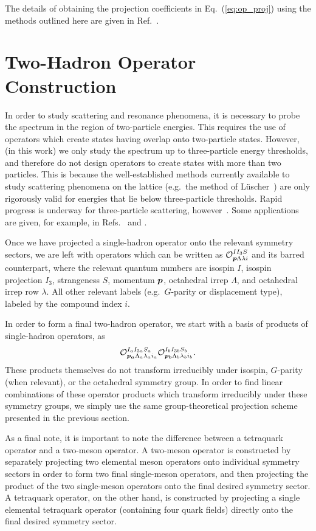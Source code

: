     The details of obtaining the projection coefficients in Eq.~(\ref{eq:op_proj}) using the methods outlined here are given in Ref.~\cite{Basak:2005aq}.
    \section{Two-Hadron Operator Construction}
    In order to study scattering and resonance phenomena, it is necessary to probe the spectrum in the region of two-particle energies. This requires the use of operators which create states having overlap onto two-particle states. However, (in this work) we only study the spectrum up to three-particle energy thresholds, and therefore do not design operators to create states with more than two particles. This is because the well-established methods currently available to study scattering phenomena on the lattice (e.g.~the method of L\"uscher~\cite{Luscher:1990ck}) are only rigorously valid for energies that lie below three-particle thresholds. Rapid progress is underway for three-particle scattering, however~\cite{Hansen:2019nir}. Some applications are given, for example, in Refs.~\cite{Horz:2019rrn} and \cite{Culver:2019vvu}.

    Once we have projected a single-hadron operator onto the relevant symmetry sectors, we are left with operators which can be written as $\mathcal O_{\boldsymbol{p} \Lambda \lambda i}^{I I_3 S}$ and its barred counterpart, where the relevant quantum numbers are isospin $I$, isospin projection $I_3$, strangeness $S$, momentum $\boldsymbol{p}$, octahedral irrep $\Lambda$, and octahedral irrep row $\lambda$. All other relevant labels (e.g.\ $G$-parity or displacement type), labeled by the compound index $i$.
    
    In order to form a final two-hadron operator, we start with a basis of products of single-hadron operators, as
    \begin{equation}
        \mathcal O_{\boldsymbol{p_a} \Lambda_a \lambda_a i_a}^{I_a I_{3a} S_a} \mathcal O_{\boldsymbol{p_b} \Lambda_b \lambda_b i_b}^{I_b I_{3b} S_b}.
    \end{equation}
    These products themselves do not transform irreducibly under isospin, $G$-parity (when relevant), or the octahedral symmetry group. In order to find linear combinations of these operator products which transform irreducibly under these symmetry groups, we simply use the same group-theoretical projection scheme presented in the previous section.

    As a final note, it is important to note the difference between a tetraquark operator and a two-meson operator. A two-meson operator is constructed by separately projecting two elemental meson operators onto individual symmetry sectors in order to form two final single-meson operators, and then projecting the product of the two single-meson operators onto the final desired symmetry sector. A tetraquark operator, on the other hand, is constructed by projecting a single elemental tetraquark operator (containing four quark fields) directly onto the final desired symmetry sector.